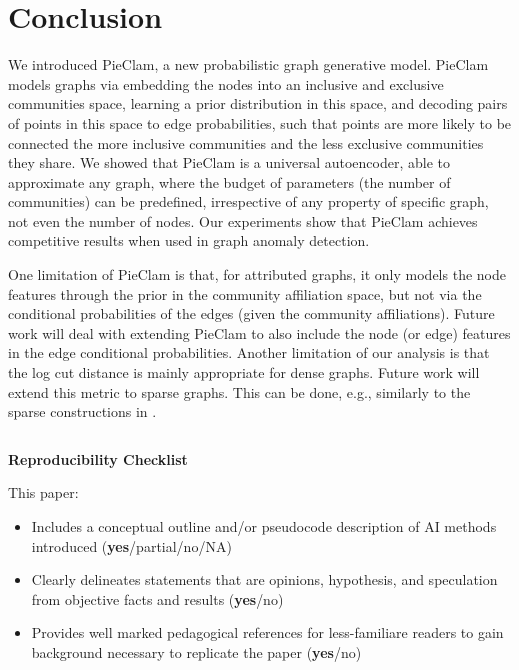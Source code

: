 \documentclass[letterpaper]{article} %
\newcommand{\ron}[1]{{{\textcolor{red}{\textbf{[Ron:} {#1}\textbf{]}}}}}
\begin{document}
\endgroup



\section{Conclusion}

We introduced PieClam, a new probabilistic graph generative model. PieClam models graphs via embedding the nodes into an inclusive and exclusive communities space, learning a prior distribution in this space, and decoding pairs of points in this space to edge probabilities, such that points are more likely to be connected the more inclusive communities and the less exclusive communities they share. We showed that PieClam is a universal autoencoder, able to approximate any graph, where the budget of parameters (the number of communities) can be predefined, irrespective of any property of specific graph, not even the number of nodes. Our experiments show that PieClam achieves competitive results when used in graph anomaly detection.

One limitation of PieClam is that, for attributed graphs, it only models the node features through the prior in the community affiliation space, but not via the conditional probabilities of the edges (given the community affiliations). Future work will deal with extending PieClam to also include the node (or edge) features in the edge conditional probabilities. 
Another limitation of our analysis is that the log cut distance is mainly appropriate for dense graphs. Future work will extend this metric to sparse graphs. This can be done, e.g., similarly to the sparse constructions in \cite{Levie_intersecting_reg_24}.






\[\]

\textbf{\Large Reproducibility Checklist}

This paper:

\begin{itemize}
    \item 
 Includes a conceptual outline and/or pseudocode description of AI methods introduced (\textbf{yes}/partial/no/NA)
    \item
Clearly delineates statements that are opinions, hypothesis, and speculation from objective facts and results (\textbf{yes}/no)
    \item
Provides well marked pedagogical references for less-familiare readers to gain background necessary to replicate the paper (\textbf{yes}/no)
\end{itemize}
\end{document}
